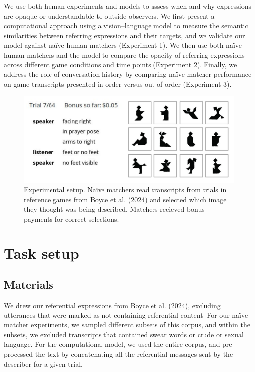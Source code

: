 \documentclass[10pt, letterpaper]{article}
\begin{document}
We use both human experiments and models to assess when and why
expressions are opaque or understandable to outside observers. We first
present a computational approach using a vision--language model to
measure the semantic similarities between referring expressions and
their targets, and we validate our model against naïve human matchers
(Experiment 1). We then use both naïve human matchers and the model to
compare the opacity of referring expressions across different game
conditions and time points (Experiment 2). Finally, we address the role
of conversation history by comparing naïve matcher performance on game
transcripts presented in order versus out of order (Experiment 3).

\begin{CodeChunk}
\begin{figure}[t!]

{\centering \includegraphics[width=1\linewidth]{matcher-diagram} 

}

\caption[Experimental setup]{Experimental setup. Naïve matchers read transcripts from trials in reference games from Boyce et al. (2024) and selected which image they thought was being described. Matchers recieved bonus payments for correct selections. \label{game}}\label{fig:interface}
\end{figure}
\end{CodeChunk}

\section{Task setup}\label{task-setup}

\subsection{Materials}\label{materials}

We drew our referential expressions from Boyce et al. (2024), excluding
utterances that were marked as not containing referential content. For
our naïve matcher experiments, we sampled different subsets of this
corpus, and within the subsets, we excluded transcripts that contained
swear words or crude or sexual language. For the computational model, we
used the entire corpus, and pre-processed the text by concatenating all
the referential messages sent by the describer for a given trial.
\end{document}
